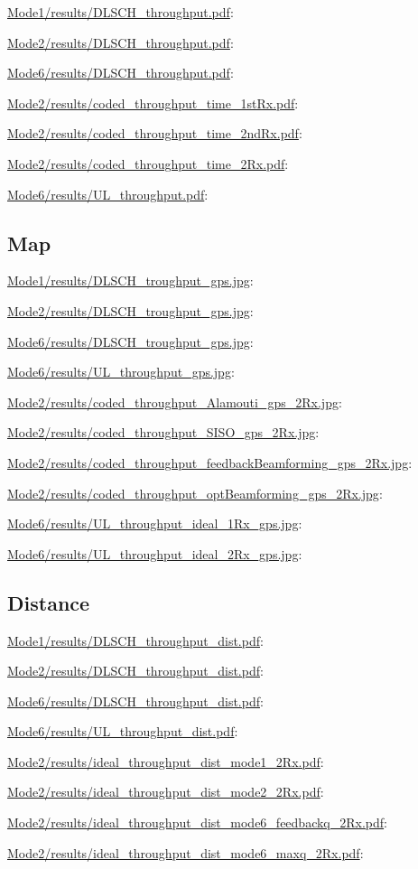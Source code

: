 \documentclass[a4paper,10pt]{article}
\newcommand{\printfile}[2][]{
 \begin{minipage}{8cm}
  \centering
  \url{#2}: #1

 \end{minipage}
}
\begin{document}
\printfile{Mode1/results/DLSCH_throughput.pdf}
\printfile{Mode2/results/DLSCH_throughput.pdf}

\printfile{Mode6/results/DLSCH_throughput.pdf}
\printfile{Mode2/results/coded_throughput_time_1stRx.pdf}

\printfile{Mode2/results/coded_throughput_time_2ndRx.pdf}
\printfile{Mode2/results/coded_throughput_time_2Rx.pdf}

\printfile{Mode6/results/UL_throughput.pdf}


\subsection{Map}

\printfile{Mode1/results/DLSCH_troughput_gps.jpg}
\printfile{Mode2/results/DLSCH_troughput_gps.jpg}

\printfile{Mode6/results/DLSCH_troughput_gps.jpg}
\printfile{Mode6/results/UL_throughput_gps.jpg}

\printfile{Mode2/results/coded_throughput_Alamouti_gps_2Rx.jpg}
\printfile{Mode2/results/coded_throughput_SISO_gps_2Rx.jpg}

\printfile{Mode2/results/coded_throughput_feedbackBeamforming_gps_2Rx.jpg}
\printfile{Mode2/results/coded_throughput_optBeamforming_gps_2Rx.jpg}

\printfile{Mode6/results/UL_throughput_ideal_1Rx_gps.jpg}
\printfile{Mode6/results/UL_throughput_ideal_2Rx_gps.jpg}

\subsection{Distance}

\printfile{Mode1/results/DLSCH_throughput_dist.pdf}
\printfile{Mode2/results/DLSCH_throughput_dist.pdf}

\printfile{Mode6/results/DLSCH_throughput_dist.pdf}
\printfile{Mode6/results/UL_throughput_dist.pdf}


\printfile{Mode2/results/ideal_throughput_dist_mode1_2Rx.pdf}
%
\printfile{Mode2/results/ideal_throughput_dist_mode2_2Rx.pdf}

\printfile{Mode2/results/ideal_throughput_dist_mode6_feedbackq_2Rx.pdf}
%
\printfile{Mode2/results/ideal_throughput_dist_mode6_maxq_2Rx.pdf}
\end{document}
